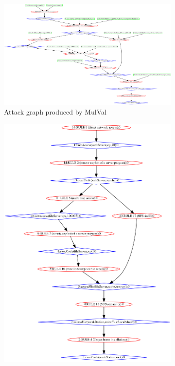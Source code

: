 \begin{figure}
    \begin{subfigure}[t]{.94\textwidth}
        \centering
        \includegraphics[width=.8\linewidth]{resource/img/ch_background/sdn_analytics/tmatrix_graphs/nameMe_001_orig.png}
        \caption{Attack graph produced by MulVal} 
        \label{fig:tg_001}
    \hfill
    \vspace{.2cm}
    \end{subfigure}
    \centering
    \begin{subfigure}[t]{0.3\textwidth}
        \includegraphics[width=\linewidth]{resource/img/ch_background/sdn_analytics/tmatrix_graphs/nameMe_002_pruneLEAFs.png} 

\end{subfigure}
\end{figure}
